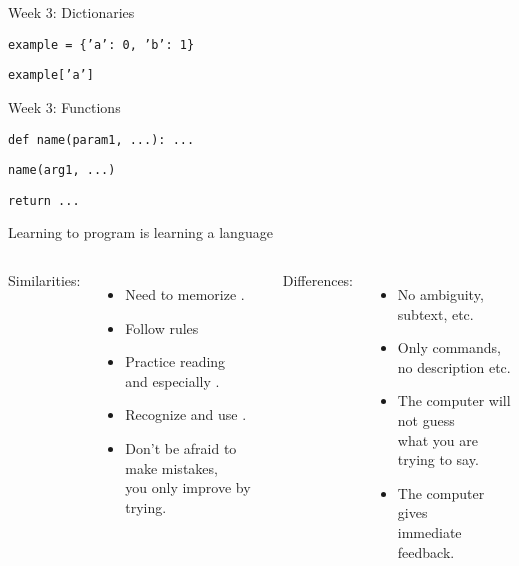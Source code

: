 \documentclass[aspectratio=169,usenames,dvipsnames]{beamer}
\begin{document}
\begin{frame}[fragile]{Week 3: Dictionaries}
    \begin{description}[creation]
        \item[creation] \texttt{example = \{'a': 0, 'b': 1\}}
        \item[lookup] \texttt{example['a']}
    \end{description}
\end{frame}
\begin{frame}[fragile]{Week 3: Functions}
    \begin{description}
        \item[Defining] \texttt{def name(param1, ...): ...}
        \item[Calling] \texttt{name(arg1, ...)}
        \item[Return value] \texttt{return ...}
    \end{description}
\end{frame}

\begin{frame}{Learning to program is learning a language}
\begin{columns}[T]
Similarities:
\begin{itemize}
	\item Need to memorize .
	\item Follow  rules
	\item Practice reading \\
			and especially .
	\item Recognize and use .
	\item Don't be afraid to make mistakes, \\
		you only improve by trying.
\end{itemize}
\pause Differences:
\pause
\begin{itemize}
	\item No ambiguity, subtext, etc.
	\item Only commands, \\
        no description etc.
	\item The computer will not guess \\
        what you are trying to say.
	\item The computer gives \\
        immediate feedback.
\end{itemize}
\end{columns}
\end{frame}
\end{document}

